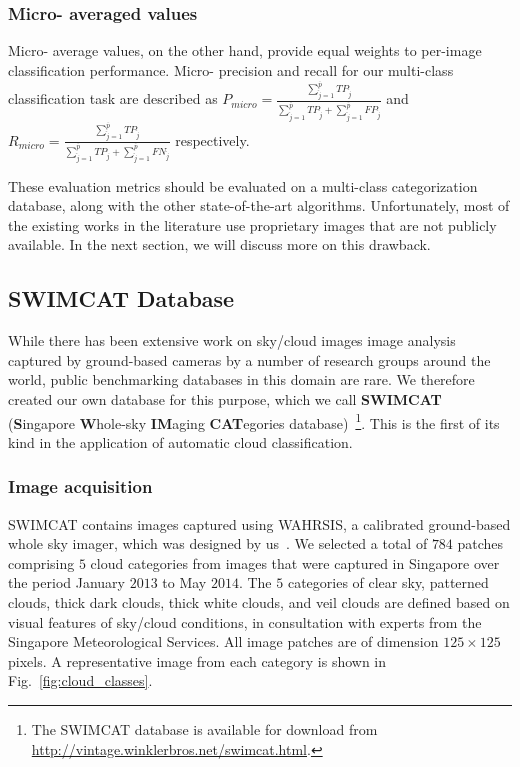 \subsubsection{Micro- averaged values}
Micro- average values, on the other hand, provide equal weights to per-image classification performance. Micro- precision and recall for our multi-class classification task are described as $P_{micro}=\frac{\sum_{\hat{j}=1}^{\overline{p}}TP_{\hat{j}}}{\sum_{\hat{j}=1}^{\overline{p}}TP_{\hat{j}}+\sum_{\hat{j}=1}^{\overline{p}}FP_{\hat{j}}}$ and $R_{micro}=\frac{\sum_{\hat{j}=1}^{\overline{p}}TP_{\hat{j}}}{\sum_{\hat{j}=1}^{\overline{p}}TP_{\hat{j}}+\sum_{\hat{j}=1}^{\overline{p}}FN_{\hat{j}}}$ respectively. 

These evaluation metrics should be evaluated on a multi-class categorization database, along with the other state-of-the-art algorithms. Unfortunately, most of the existing works in the literature use proprietary images that are not publicly available. In the next section, we will discuss more on this drawback.

\subsection{SWIMCAT Database}
While there has been extensive work on sky/cloud images image analysis captured by ground-based cameras by a number of research groups around the world, public benchmarking databases in this domain are rare. We therefore created our own database for this purpose, which we call \textbf{SWIMCAT} (\textbf{S}ingapore \textbf{W}hole-sky \textbf{IM}aging \textbf{CAT}egories database)~\footnote{The SWIMCAT database is available for download from \url{http://vintage.winklerbros.net/swimcat.html}.}. This is the first of its kind in the application of automatic cloud classification.

\subsubsection{Image acquisition}
SWIMCAT contains images captured using WAHRSIS, a calibrated ground-based whole sky imager, which was designed by us~\cite{WAHRSIS}. We selected a total of $784$ patches comprising $5$ cloud categories from images that were captured in Singapore over the period January $2013$ to May $2014$.  The $5$ categories of clear sky, patterned clouds, thick dark clouds, thick white clouds, and veil clouds are defined based on visual features of sky/cloud conditions, in consultation with experts from the Singapore Meteorological Services. All image patches are of dimension $125 \times 125$ pixels. A representative image from each category is shown in Fig.~\ref{fig:cloud_classes}.  

